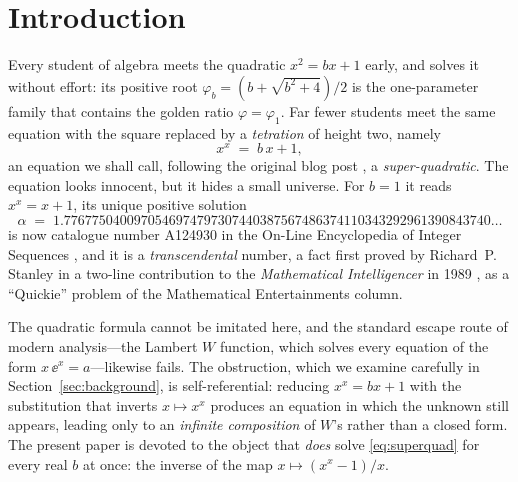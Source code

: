 \section{Introduction}\label{sec:intro}

Every student of algebra meets the quadratic $x^{2} = bx + 1$ early, and
solves it without effort: its positive root $\varphi_b = (b + \sqrt{b^{2}+4})/2$
is the one-parameter family that contains the golden ratio
$\varphi = \varphi_1$. Far fewer students meet the same equation with the
square replaced by a \emph{tetration} of height two, namely
\begin{equation}\label{eq:superquad}
    x^{x} \;=\; b\,x + 1 ,
\end{equation}
an equation we shall call, following the original blog post
\cite{blog}, a \emph{super-quadratic}. The equation looks innocent, but it
hides a small universe. For $b = 1$ it reads $x^{x} = x + 1$, its unique
positive solution
\begin{equation}\label{eq:alpha-def}
    \alpha \;=\; 1.7767750400970546974797307440387567486374110343292961390843740\ldots
\end{equation}
is now catalogue number \textrm{A124930} in the On-Line Encyclopedia of
Integer Sequences \cite{a124930}, and it is a \emph{transcendental}
number, a fact first proved by Richard~P. Stanley in a two-line
contribution to the \emph{Mathematical Intelligencer} in 1989
\cite{stanley89}, as a ``Quickie'' problem of the Mathematical
Entertainments column.

The quadratic formula cannot be imitated here, and the standard escape
route of modern analysis---the Lambert $W$ function, which solves every
equation of the form $x\,\ee^{x} = a$---likewise fails. The obstruction,
which we examine carefully in Section~\ref{sec:background}, is
self-referential: reducing $x^{x} = bx + 1$ with the substitution that
inverts $x \mapsto x^{x}$ produces an equation in which the unknown still
appears, leading only to an \emph{infinite composition} of $W$'s rather
than a closed form. The present paper is devoted to the object that
\emph{does} solve \eqref{eq:superquad} for every real $b$ at once: the
inverse of the map $x \mapsto (x^{x}-1)/x$.

